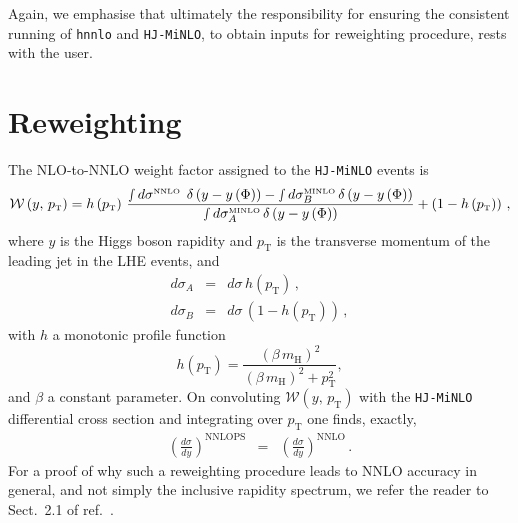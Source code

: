 \documentclass[11pt,a4paper]{article}
\newcommand{\noun}[1]{{\tt #1}}
\newcommand{\HJMINLO}{\noun{HJ-MiNLO}}
\newcommand{\HNNLO}{\noun{hnnlo}}
\newcommand{\pt}{p_{\scriptscriptstyle \mathrm{T}}}
\newcommand{\hc}{\beta}
\begin{document}
\noindent Again, we emphasise that ultimately the responsibility for ensuring
the consistent running of \HNNLO{} and \HJMINLO{}, to obtain inputs
for reweighting procedure, rests with the user.

\section{Reweighting\label{sub:Reweighting}}

The NLO-to-NNLO weight factor assigned to the \HJMINLO{} events is
\begin{equation}
\mathcal{W}\left(y,\, \pt\right)=h\left(\pt\right)\,\frac{\smallint d\sigma^{{\scriptscriptstyle \mathrm{NNLO\phantom{i}}}}\,\delta\left(y-y\left(\Phi\right)\right)-\smallint d\sigma_{B}^{{\scriptscriptstyle \mathrm{MINLO}}}\,\delta\left(y-y\left(\Phi\right)\right)}{\smallint d\sigma_{A}^{{\scriptscriptstyle \mathrm{MINLO}}}\,\delta\left(y-y\left(\Phi\right)\right)}+\left(1-h\left(\pt\right)\right)\,,\label{eq:NNLOPS-overall-rwgt-factor-1}
\end{equation}
where $y$ is the Higgs boson rapidity and $\pt$ is the transverse momentum
of the leading jet in the LHE events, and
\begin{eqnarray}
d\sigma_{A} & = & d\sigma\, h\left(\pt\right)\,,\label{eq:NNLOPS-dsig0}\\
d\sigma_{B} & = & d\sigma\,\left(1-h\left(\pt\right)\right)\,,\label{eq:NNLOPS-dsig1}
\end{eqnarray}
with $h$ a monotonic profile function 
\begin{equation}
h(\pt)=\frac{(\hc\, m_{{\scriptscriptstyle \mathrm{H}}})^{2}}{(\hc\, m_{{\scriptscriptstyle \mathrm{H}}})^{2}+\pt^{2}},\label{eq:NNLOPS-hpT-fn-defn}
\end{equation}
and $\hc$ a constant parameter. 
On convoluting $\mathcal{W}\left(y,\, \pt\right)$ with the \HJMINLO{} differential cross section
and integrating over $\pt$ one finds, exactly,
\begin{eqnarray}
\left(\frac{d\sigma}{dy}\right)^{{\scriptscriptstyle \mathrm{NNLOPS}}} & = & \left(\frac{d\sigma}{dy}\right)^{{\scriptscriptstyle \mathrm{NNLO}}}\,.\label{eq:NNLOPS-NNLOPS-eq-NNLO_0+MINLO_1-1}
\end{eqnarray}
For a proof of why such a reweighting procedure leads to NNLO accuracy in
general, and not simply the inclusive rapidity spectrum, we refer the
reader to Sect.~2.1 of ref.~\cite{Hamilton:2013fea}. 
\end{document}
